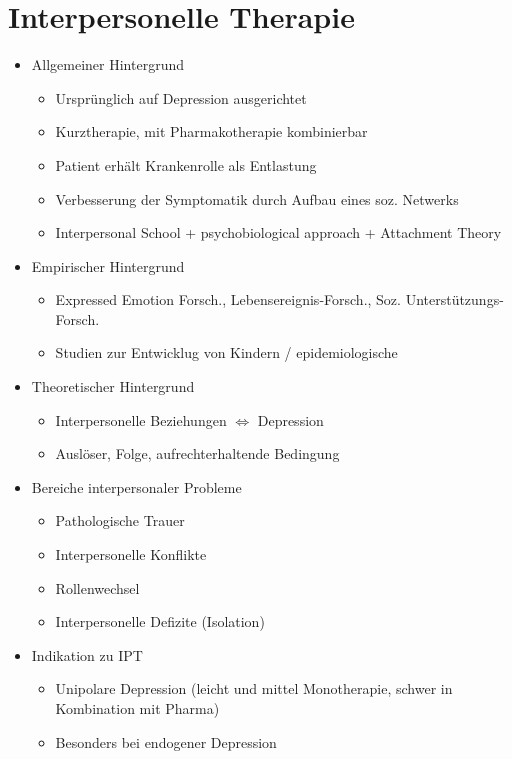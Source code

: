 \documentclass[11pt, paper=a4, twocolumn]{scrartcl}
\begin{document}
	\section{Interpersonelle Therapie}
		\begin{itemize}
			\item Allgemeiner Hintergrund
				\begin{itemize}
					\item Ursprünglich auf Depression ausgerichtet
					\item Kurztherapie, mit Pharmakotherapie kombinierbar
					\item Patient erhält Krankenrolle als Entlastung
					\item Verbesserung der Symptomatik durch Aufbau eines soz. Netwerks
					\item Interpersonal School + psychobiological approach + Attachment Theory
				\end{itemize}
			\item Empirischer Hintergrund	
				\begin{itemize}
					\item Expressed Emotion Forsch., Lebensereignis-Forsch., Soz. Unterstützungs-Forsch.
					\item Studien zur Entwicklug von Kindern / epidemiologische
				\end{itemize}
			\item Theoretischer Hintergrund
				\begin{itemize}
					\item Interpersonelle Beziehungen $\Leftrightarrow$ Depression
					\item Auslöser, Folge, aufrechterhaltende Bedingung
				\end{itemize}
			\item Bereiche interpersonaler Probleme
				\begin{itemize}
					\item Pathologische Trauer
					\item Interpersonelle Konflikte
					\item Rollenwechsel
					\item Interpersonelle Defizite (Isolation)
				\end{itemize}
			\item Indikation zu IPT
				\begin{itemize}
					\item Unipolare Depression (leicht und mittel Monotherapie, schwer in Kombination mit Pharma)
					\item Besonders bei endogener Depression

\end{itemize}
\end{itemize}
\end{document}
